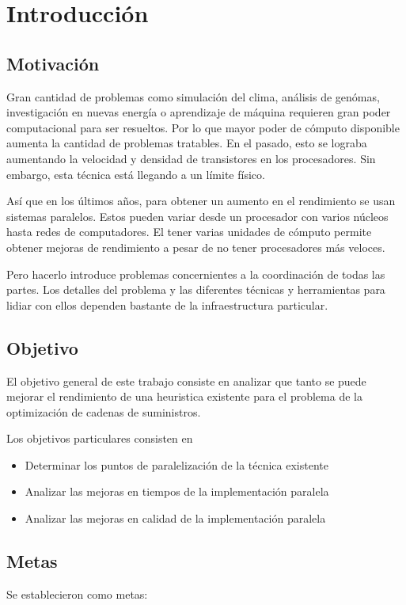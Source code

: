\chapter{Introducción}
\label{cap:intro}

\section{Motivación}

Gran cantidad de problemas como simulación del clima, análisis de genómas,
investigación en nuevas energía o aprendizaje de máquina \cite{Pacheco2011}
requieren gran poder computacional para ser resueltos. Por lo que mayor poder
de cómputo disponible aumenta la cantidad de problemas tratables. En el pasado,
esto se lograba aumentando la velocidad y densidad de transistores en los
procesadores. Sin embargo, esta técnica está llegando a un límite físico.

Así que en los últimos años, para obtener un aumento en el rendimiento se usan
sistemas paralelos. Estos pueden variar desde un procesador con varios núcleos
hasta redes de computadores. El tener varias unidades de cómputo permite obtener
mejoras de rendimiento a pesar de no tener procesadores más veloces.

Pero hacerlo introduce problemas concernientes a la coordinación de todas las
partes. Los detalles del problema y las diferentes técnicas y herramientas para
lidiar con ellos dependen bastante de la infraestructura particular.

\section{Objetivo}

El objetivo general de este trabajo consiste en analizar que tanto se puede
mejorar el rendimiento de una heuristica existente para el problema de la
optimización de cadenas de suministros.

Los objetivos particulares consisten en

\begin{itemize}
  \item Determinar los puntos de paralelización de la técnica existente
  \item Analizar las mejoras en tiempos de la implementación paralela
  \item Analizar las mejoras en calidad de la implementación paralela
\end{itemize}

\section{Metas}
Se establecieron como metas:

